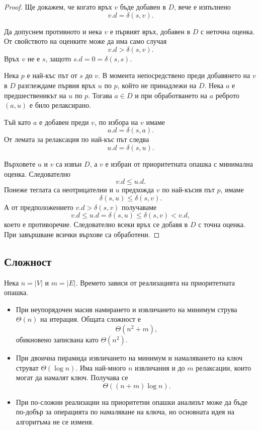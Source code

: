 \begin{proof}
Ще докажем, че когато връх $v$ бъде добавен в $D$, вече е изпълнено
\[
v.d=\delta(s,v).
\]

Да допуснем противното и нека $v$ е първият връх, добавен в $D$ с неточна оценка. От свойството на оценките може да има само случая
\[
v.d>\delta(s,v).
\]
Връх $v$ не е $s$, защото $s.d=0=\delta(s,s)$.

Нека $p$ е най-къс път от $s$ до $v$. В момента непосредствено преди добавянето на $v$ в $D$ разглеждаме първия връх $u$ по $p$, който не принадлежи на $D$. Нека $a$ е предшественикът на $u$ по $p$. Тогава $a\in D$ и при обработването на $a$ реброто $(a,u)$ е било релаксирано.

Тъй като $a$ е добавен преди $v$, по избора на $v$ имаме
\[
a.d=\delta(s,a).
\]
От лемата за релаксация по най-къс път следва
\[
u.d=\delta(s,u).
\]

Върховете $u$ и $v$ са извън $D$, а $v$ е избран от приоритетната опашка с минимална оценка. Следователно
\[
v.d\leq u.d.
\]
Понеже теглата са неотрицателни и $u$ предхожда $v$ по най-късия път $p$, имаме
\[
\delta(s,u)\leq\delta(s,v).
\]
А от предположението $v.d>\delta(s,v)$ получаваме
\[
v.d\leq u.d=\delta(s,u)\leq\delta(s,v)<v.d,
\]
което е противоречие. Следователно всеки връх се добавя в $D$ с точна оценка. При завършване всички върхове са обработени.
\end{proof}

\subsection{Сложност}\label{s:8.3.6}

Нека $n=|V|$ и $m=|E|$. Времето зависи от реализацията на приоритетната опашка.

\begin{itemize}
\item При неупорядочен масив намирането и извличането на минимум струва $\Theta(n)$ на итерация. Общата сложност е
\[
\Theta(n^2+m),
\]
обикновено записвана като $\Theta(n^2)$.

\item При двоична пирамида извличането на минимум и намаляването на ключ струват $\Theta(\log n)$. Има най-много $n$ извличания и до $m$ релаксации, които могат да намалят ключ. Получава се
\[
\Theta((n+m)\log n).
\]

\item При по-сложни реализации на приоритетни опашки анализът може да бъде по-добър за операцията по намаляване на ключа, но основната идея на алгоритъма не се изменя.
\end{itemize}


